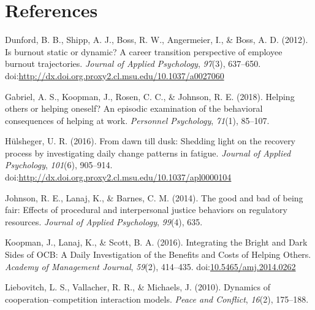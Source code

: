 \documentclass[english,,man]{apa6}
\theoremstyle{definition}
\theoremstyle{definition}
\theoremstyle{definition}
\theoremstyle{remark}
\begin{document}
\newpage

\hypertarget{references}{%
\section{References}\label{references}}

\setlength{\parindent}{-0.5in}
\setlength{\leftskip}{0.5in}

\hypertarget{refs}{}
\leavevmode\hypertarget{ref-dunford_is_2012}{}%
Dunford, B. B., Shipp, A. J., Boss, R. W., Angermeier, I., \& Boss, A.
D. (2012). Is burnout static or dynamic? A career transition perspective
of employee burnout trajectories. \emph{Journal of Applied Psychology},
\emph{97}(3), 637--650.
doi:\href{https://doi.org/http://dx.doi.org.proxy2.cl.msu.edu/10.1037/a0027060}{http://dx.doi.org.proxy2.cl.msu.edu/10.1037/a0027060}

\leavevmode\hypertarget{ref-gabriel_helping_2018}{}%
Gabriel, A. S., Koopman, J., Rosen, C. C., \& Johnson, R. E. (2018).
Helping others or helping oneself? An episodic examination of the
behavioral consequences of helping at work. \emph{Personnel Psychology},
\emph{71}(1), 85--107.

\leavevmode\hypertarget{ref-hulsheger_dawn_2016}{}%
Hülsheger, U. R. (2016). From dawn till dusk: Shedding light on the
recovery process by investigating daily change patterns in fatigue.
\emph{Journal of Applied Psychology}, \emph{101}(6), 905--914.
doi:\href{https://doi.org/http://dx.doi.org.proxy2.cl.msu.edu/10.1037/apl0000104}{http://dx.doi.org.proxy2.cl.msu.edu/10.1037/apl0000104}

\leavevmode\hypertarget{ref-johnson_good_2014}{}%
Johnson, R. E., Lanaj, K., \& Barnes, C. M. (2014). The good and bad of
being fair: Effects of procedural and interpersonal justice behaviors on
regulatory resources. \emph{Journal of Applied Psychology},
\emph{99}(4), 635.

\leavevmode\hypertarget{ref-koopman_integrating_2016}{}%
Koopman, J., Lanaj, K., \& Scott, B. A. (2016). Integrating the Bright
and Dark Sides of OCB: A Daily Investigation of the Benefits and Costs
of Helping Others. \emph{Academy of Management Journal}, \emph{59}(2),
414--435.
doi:\href{https://doi.org/10.5465/amj.2014.0262}{10.5465/amj.2014.0262}

\leavevmode\hypertarget{ref-liebovitch2010dynamics}{}%
Liebovitch, L. S., Vallacher, R. R., \& Michaels, J. (2010). Dynamics of
cooperation--competition interaction models. \emph{Peace and Conflict},
\emph{16}(2), 175--188.
\end{document}
